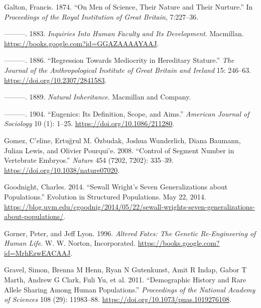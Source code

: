 \documentclass[
]{book}
\newlength{\cslhangindent}
\newlength{\cslentryspacingunit} %
\newenvironment{CSLReferences}[2] %
 {%
  \setlength{\parindent}{0pt}
  \ifodd #1
  \let\oldpar\par
  \def\par{\hangindent=\cslhangindent\oldpar}
  \fi
  \setlength{\parskip}{#2\cslentryspacingunit}
 }%
 {}
\begin{document}
\begin{CSLReferences}{1}{0}
\leavevmode{}%
Galton, Francis. 1874. {``On {Men} of {Science}, Their {Nature} and Their {Nurture}.''} In \emph{Proceedings of the {Royal Institution} of {Great Britain}}, 7:227--36.

\leavevmode{}%
---------. 1883. \emph{Inquiries {Into Human Faculty} and {Its Development}}. {Macmillan}. \url{https://books.google.com?id=GGAZAAAAYAAJ}.

\leavevmode{}%
---------. 1886. {``Regression {Towards Mediocrity} in {Hereditary Stature}.''} \emph{The Journal of the Anthropological Institute of Great Britain and Ireland} 15: 246--63. \url{https://doi.org/10.2307/2841583}.

\leavevmode{}%
---------. 1889. \emph{Natural Inheritance}. {Macmillan and Company}.

\leavevmode{}%
---------. 1904. {``Eugenics: {Its Definition}, {Scope}, and {Aims}.''} \emph{American Journal of Sociology} 10 (1): 1--25. \url{https://doi.org/10.1086/211280}.

\leavevmode{}%
Gomez, C'eline, Ertuğrul M. Özbudak, Joshua Wunderlich, Diana Baumann, Julian Lewis, and Olivier Pourqui'e. 2008. {``Control of Segment Number in Vertebrate Embryos.''} \emph{Nature} 454 (7202, 7202): 335--39. \url{https://doi.org/10.1038/nature07020}.

\leavevmode{}%
Goodnight, Charles. 2014. {``Sewall {Wright}'s {Seven Generalizations} about {Populations}.''} {Evolution in Structured Populations}. May 22, 2014. \url{https://blog.uvm.edu/cgoodnig/2014/05/22/sewall-wrights-seven-generalizations-about-populations/}.

\leavevmode{}%
Gorner, Peter, and Jeff Lyon. 1996. \emph{Altered {Fates}: {The Genetic Re-Engineering} of {Human Life}}. {W. W. Norton, Incorporated}. \url{https://books.google.com?id=MrhEzwEACAAJ}.

\leavevmode{}%
Gravel, Simon, Brenna M Henn, Ryan N Gutenkunst, Amit R Indap, Gabor T Marth, Andrew G Clark, Fuli Yu, et al. 2011. {``Demographic History and Rare Allele Sharing Among Human Populations.''} \emph{Proceedings of the National Academy of Sciences} 108 (29): 11983--88. \url{https://doi.org/10.1073/pnas.1019276108}.


\end{CSLReferences}
\end{document}
